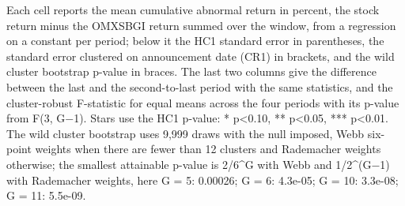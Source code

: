 \begin{threeparttable}
\begin{minipage}{\linewidth}
Each cell reports the mean cumulative abnormal return in percent, the stock return minus the OMXSBGI return summed over the window, from a regression on a constant per period; below it the HC1 standard error in parentheses, the standard error clustered on announcement date (CR1) in brackets, and the wild cluster bootstrap p-value in braces. The last two columns give the difference between the last and the second-to-last period with the same statistics, and the cluster-robust F-statistic for equal means across the four periods with its p-value from F(3, G$-$1). Stars use the HC1 p-value: * p<0.10, ** p<0.05, *** p<0.01. The wild cluster bootstrap uses 9,999 draws with the null imposed, Webb six-point weights when there are fewer than 12 clusters and Rademacher weights otherwise; the smallest attainable p-value is 2/6\textasciicircum{}G with Webb and 1/2\textasciicircum{}(G$-$1) with Rademacher weights, here G = 5: 0.00026; G = 6: 4.3e-05; G = 10: 3.3e-08; G = 11: 5.5e-09.\end{minipage}

\end{threeparttable}